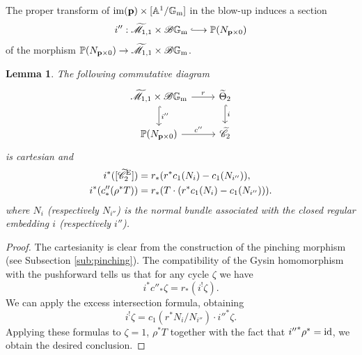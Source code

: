 \documentclass[a4paper, 10pt]{amsart}
\numberwithin{equation}{section}
\numberwithin{subsection}{section}
\newtheorem{lemma}[theorem]{Lemma}
\theoremstyle{definition}
\theoremstyle{remark}
\renewcommand{\mathcal}{\mathscr}
\renewcommand\AA{\mathbb{A}} \newcommand\BB{\mathbb{B}}
\newcommand\GG{\mathbb{G}} \newcommand\HH{\mathbb{H}}
\newcommand\rmm{\mathrm{m}} \newcommand\rmn{\mathrm{n}}
\newcommand{\hooklongrightarrow}{\lhook\joinrel\longrightarrow}
\newcommand\im[1]{\operatorname{im}(#1)}
\newcommand{\gm}{\GG_{\rmm}}
\newcommand{\Mtilde}{\widetilde{\mathcal M}}
\newcommand{\Ctilde}{\widetilde{\mathcal C}}
\newcommand{\ThTilde}{\widetilde{\Theta}}
\begin{document}
	The proper transform of $\im{\bfp} \times [\AA^1/\gm]$ in the blow-up induces a section 
	$$ i'': \Mtilde_{1,1} \times \cB\gm \hooklongrightarrow \PP(N_{\bfp \times 0})$$
	of the morphism $\PP(N_{\bfp \times 0}) \rightarrow \Mtilde_{1,1}\times \cB\gm$.
	
	\begin{lemma}\label{lm:formula for C2tildeE in ThTilde2}
		The following commutative diagram
		\begin{equation}\label{eq:excess}\begin{tikzcd}
				{\Mtilde_{1,1}\times \cB\gm} \arrow[d, "i''", hook] \arrow[r, "r"] &  \ThTilde_2 \arrow[d, "i", hook] \\
				\PP(N_{\bfp \times 0}) \arrow[r, "c''"] & \Ctilde_2                               
		\end{tikzcd}\end{equation}
		is cartesian and 
		\begin{align*}
		    i^*([\Ctilde_2^{\rm E}]) &= r_*(r^*c_1(N_{i})-c_1(N_{i''})), \\
		    i^*(c''_*(\rho^*T)) &= r_*(T\cdot (r^*c_1(N_{i})-c_1(N_{i''}))).
		\end{align*}
		where $N_i$ (respectively $N_{i''}$) is the normal bundle associated with the closed regular embedding $i$ (respectively $i''$).
	\end{lemma}
	\begin{proof}
		The cartesianity is clear from the construction of the pinching morphism (see Subsection \ref{sub:pinching}).
		The compatibility of the Gysin homomorphism with the pushforward tells us that for any cycle $\zeta$ we have
		\[ i^*c''_*\zeta = r_*(i^{!}\zeta). \]
		We can apply the excess intersection formula, obtaining
		\[ i^{!}\zeta = c_1(r^*N_{i}/N_{i''}) \cdot {i''}^*\zeta.  \]
		Applying these formulas to $\zeta=1$, $\rho^*T$ together with the fact that ${i''}^*\rho^*={\rm id}$, we obtain the desired conclusion.
    \end{proof}
	
\end{document}
